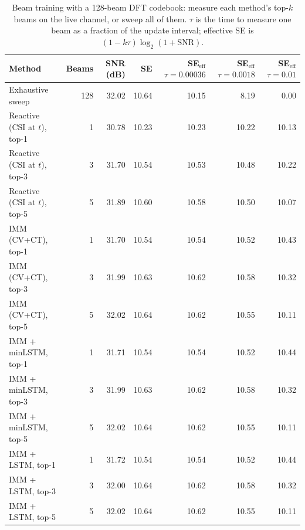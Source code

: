 \begin{table}[t]
\centering
\caption{Beam training with a 128-beam DFT codebook: measure each method's top-$k$ beams on the live channel, or sweep all of them. $\tau$ is the time to measure one beam as a fraction of the update interval; effective SE is $(1-k\tau)\log_2(1+\mathrm{SNR})$.}\label{tab:training128}
\begin{tabular}{lrrrrrr}
\toprule
Method & Beams & SNR (dB) & SE & SE$_{\mathrm{eff}}$ $\tau{=}0.00036$ & SE$_{\mathrm{eff}}$ $\tau{=}0.0018$ & SE$_{\mathrm{eff}}$ $\tau{=}0.01$ \\
\midrule
Exhaustive sweep & 128 & 32.02 & 10.64 & 10.15 & 8.19 & 0.00 \\
Reactive (CSI at $t$), top-1 & 1 & 30.78 & 10.23 & 10.23 & 10.22 & 10.13 \\
Reactive (CSI at $t$), top-3 & 3 & 31.70 & 10.54 & 10.53 & 10.48 & 10.22 \\
Reactive (CSI at $t$), top-5 & 5 & 31.89 & 10.60 & 10.58 & 10.50 & 10.07 \\
IMM (CV+CT), top-1 & 1 & 31.70 & 10.54 & 10.54 & 10.52 & 10.43 \\
IMM (CV+CT), top-3 & 3 & 31.99 & 10.63 & 10.62 & 10.58 & 10.32 \\
IMM (CV+CT), top-5 & 5 & 32.02 & 10.64 & 10.62 & 10.55 & 10.11 \\
IMM + minLSTM, top-1 & 1 & 31.71 & 10.54 & 10.54 & 10.52 & 10.44 \\
IMM + minLSTM, top-3 & 3 & 31.99 & 10.63 & 10.62 & 10.58 & 10.32 \\
IMM + minLSTM, top-5 & 5 & 32.02 & 10.64 & 10.62 & 10.55 & 10.11 \\
IMM + LSTM, top-1 & 1 & 31.72 & 10.54 & 10.54 & 10.52 & 10.44 \\
IMM + LSTM, top-3 & 3 & 32.00 & 10.64 & 10.62 & 10.58 & 10.32 \\
IMM + LSTM, top-5 & 5 & 32.02 & 10.64 & 10.62 & 10.55 & 10.11 \\
\bottomrule
\end{tabular}
\end{table}
